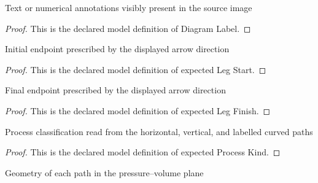\begin{definition}
  \label{def:physics:phyx-mini-0428:phyxminiproblems-problemphyxmini0428-diagramlabel}
  Text or numerical annotations visibly present in the source image
\end{definition}
\begin{proof}
  This is the declared model definition of Diagram Label.
\end{proof}
\begin{definition}
  \label{def:physics:phyx-mini-0428:phyxminiproblems-problemphyxmini0428-expectedlegstart}
  Initial endpoint prescribed by the displayed arrow direction
\end{definition}
\begin{proof}
  This is the declared model definition of expected Leg Start.
\end{proof}
\begin{definition}
  \label{def:physics:phyx-mini-0428:phyxminiproblems-problemphyxmini0428-expectedlegfinish}
  Final endpoint prescribed by the displayed arrow direction
\end{definition}
\begin{proof}
  This is the declared model definition of expected Leg Finish.
\end{proof}
\begin{definition}
  \label{def:physics:phyx-mini-0428:phyxminiproblems-problemphyxmini0428-expectedprocesskind}
  Process classification read from the horizontal, vertical, and labelled curved paths
\end{definition}
\begin{proof}
  This is the declared model definition of expected Process Kind.
\end{proof}
\begin{definition}
  \label{def:physics:phyx-mini-0428:phyxminiproblems-problemphyxmini0428-expectedpathgeometry}
  Geometry of each path in the pressure--volume plane
\end{definition}
